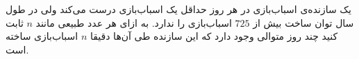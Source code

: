 \EXERCISE
یک سازنده‌ی اسباب‌بازی در هر روز حداقل یک اسباب‌بازی درست می‌کند ولی در طول سال توان ساخت بیش از
$725$
اسباب‌بازی را ندارد. به ازای هر عدد طبیعی مانند
$n$
ثابت کنید چند روز متوالی وجود دارد که این سازنده طی آن‌ها دقیقا
$n$
اسباب‌بازی ساخته است.
